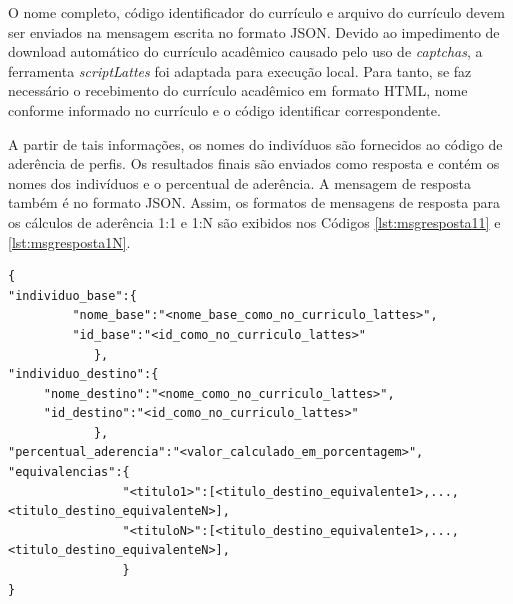 O nome completo, código identificador do currículo e arquivo do currículo devem ser enviados na mensagem escrita no formato JSON. Devido ao impedimento de download automático do currículo acadêmico causado pelo uso de \textit{captchas}, a ferramenta \textit{scriptLattes} foi adaptada para execução local. Para tanto, se faz necessário o recebimento do currículo acadêmico em formato HTML, nome conforme informado no currículo e o código identificar correspondente.

A partir de tais informações, os nomes do indivíduos são fornecidos ao código de aderência de perfis. Os resultados finais são enviados como resposta e contém os nomes dos indivíduos e o percentual de aderência. A mensagem de resposta também é no formato JSON. Assim, os formatos de mensagens de resposta para os cálculos de aderência 1:1 e 1:N são exibidos nos Códigos \ref{lst:msgresposta11} e \ref{lst:msgresposta1N}.



\begin{lstlisting}[caption={Formato de mensagem de resposta(1:1).},label={lst:msgresposta11}]
{
"individuo_base":{
         "nome_base":"<nome_base_como_no_curriculo_lattes>",
         "id_base":"<id_como_no_curriculo_lattes>"
            },
"individuo_destino":{
     "nome_destino":"<nome_como_no_curriculo_lattes>",
     "id_destino":"<id_como_no_curriculo_lattes>"
            },
"percentual_aderencia":"<valor_calculado_em_porcentagem>",
"equivalencias":{
				"<titulo1>":[<titulo_destino_equivalente1>,...,<titulo_destino_equivalenteN>],
				"<tituloN>":[<titulo_destino_equivalente1>,...,<titulo_destino_equivalenteN>],
				}
}


\end{lstlisting}



